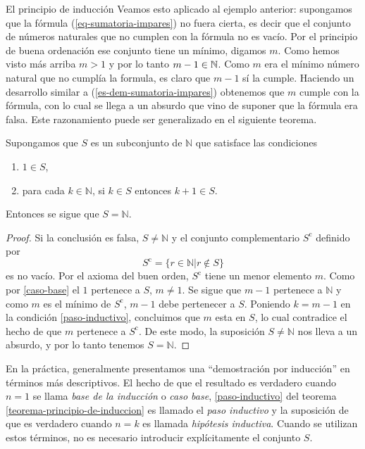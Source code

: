 \begin{section}{El principio de inducción}
Veamos esto aplicado al ejemplo anterior: supongamos que la fórmula  (\ref{eq-sumatoria-impares}) no fuera cierta,  es decir que el conjunto de números naturales que no cumplen con la fórmula no es vacío. Por el principio de buena ordenación ese conjunto tiene un mínimo, digamos $m$. Como hemos visto más arriba $m > 1$ y por lo tanto $m-1 \in {\mathbb N}$. Como $m$ era el mínimo número natural que no cumplía la formula, es claro que $m-1$ sí la cumple. Haciendo un desarrollo similar a (\ref{es-dem-sumatoria-impares}) obtenemos que $m$  cumple con la fórmula, con lo cual se llega a un absurdo  que vino de suponer que la fórmula era falsa. Este razonamiento puede ser generalizado en el siguiente teorema. 



\begin{teorema}\label{teorema-principio-de-induccion} Supongamos que $S$ es un subconjunto de $\mathbb N$ que satisface las condiciones 
\begin{enumerate}[label=\textit{\alph*)}]
\item\label{caso-base} $1 \in S$,
\item\label{paso-inductivo} para cada $k \in \mathbb N$, si $ k \in S$ entonces $k+1\in S$.
\end{enumerate}
Entonces se sigue que $S=\mathbb N$.
\end{teorema}
\begin{proof}Si la conclusión es falsa, $S \not= \mathbb N$ y
el conjunto complementario $S^{\text{c}}$ definido por
$$
S^{\text{c}}= \{ r \in \mathbb N | r\not\in S\}
$$
 es no vacío. Por el axioma del buen orden, $S^{\text{c}}$ tiene un menor elemento $m$. Como por \ref{caso-base} el $1$ pertenece a $S$, $m\not=1$. Se sigue que $m-1$ pertenece a $\mathbb N$ y como $m$ es el mínimo de $S^{\text{c}}$, $m-1$ debe pertenecer a $S$. Poniendo $k=m-1$ en la condición \ref{paso-inductivo}, concluimos que $m$ esta en $S$, lo cual contradice el hecho de que $m$ pertenece a $S^{\text{c}}$. De este modo, la suposición $S \not= \mathbb N$ nos lleva a un absurdo, y por lo tanto tenemos $S= \mathbb N$. 
 \end{proof}

En la práctica, generalmente presentamos una ``demostración por inducción'' en términos más descriptivos. El hecho de que el resultado es verdadero cuando $n=1$ se llama \textit{base de la inducción} o \textit{caso base}, \ref{paso-inductivo} del teorema \ref{teorema-principio-de-induccion} es llamado  el \textit{paso inductivo} y la suposición de que es verdadero cuando $n=k$ es llamada \textit{hipótesis inductiva}. Cuando se utilizan estos términos, no es necesario introducir explícitamente el conjunto $S$.



\end{section}
